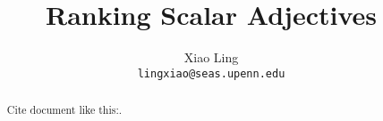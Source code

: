 \documentclass[11pt,letterpaper]{article}
\title{Ranking Scalar Adjectives}
\author{Xiao Ling\\
  {\tt lingxiao@seas.upenn.edu}}
\date{}
\theoremstyle{definition}
\theoremstyle{remark}
\theoremstyle{remark}
\begin{document}

\begin{abstract}
	Cite document like this:.
\end{abstract}




















\newpage
\end{document}
